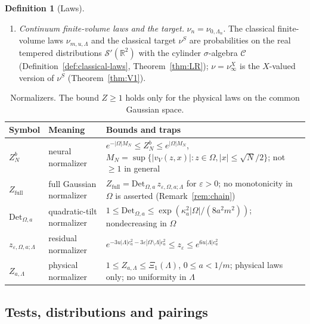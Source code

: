 \documentclass[11pt]{article}
\theoremstyle{plain}
\theoremstyle{definition}
\newtheorem{definition}[theorem]{Definition}
\theoremstyle{remark}
\newcommand{\R}{\mathbb{R}}
\newcommand{\E}{\mathbb{E}}
\newcommand{\cC}{\mathcal{C}}
\newcommand{\cS}{\mathcal{S}}
\newcommand{\ind}{\mathbf{1}}
\newcommand{\Det}{\mathrm{Det}}
\begin{document}
\begin{definition}[Laws]
\begin{enumerate}[label=(\alph*)]
  \begin{equation}\label{eq:physlaw}
  \nu_{a,\Lambda}(B)=\E_0\bigl[\ind_B(\Phi_a)\,e^{-U_{a,\Lambda}}\bigr]/Z_{a,\Lambda}.
  \end{equation}
\item \emph{Continuum finite-volume laws and the target.} $\nu_n=\nu_{0,\Lambda_n}$.
  The classical finite-volume laws $\nu_{m,u,\Lambda}$ and the classical target
  $\nu^{S}$ are probabilities on the real tempered distributions $\cS'(\R^{2})$
  with the cylinder $\sigma$-algebra $\cC$ (Definition~\ref{def:classical-laws},
  Theorem~\ref{thm:LR}); $\nu=\nu^{X}_\infty$ is the $X$-valued version of
  $\nu^{S}$ (Theorem~\ref{thm:V1}).
\end{enumerate}
\end{definition}

\begin{table}[ht]
\centering
\small
\begin{tabular}{@{}p{}p{}p{}@{}}
\toprule
Symbol & Meaning & Bounds and traps\\
\midrule
$Z^{b}_{N}$ & neural normalizer & $e^{-|\Omega|M_N}\le Z^b_N\le e^{|\Omega|M_N}$, $M_N=\sup\{|v_V(z,x)|:z\in\Omega,|x|\le\sqrt N/2\}$; not $\ge1$ in general\\
$Z_{\mathrm{full}}$ & full Gaussian normalizer & $Z_{\mathrm{full}}=\Det_{\Omega,a}\,z_{\varepsilon,\Omega,a;\Lambda}$ for $\varepsilon>0$; no monotonicity in $\Omega$ is asserted (Remark~\ref{rem:chain})\\
$\Det_{\Omega,a}$ & quadratic-tilt normalizer & $1\le\Det_{\Omega,a}\le\exp(\kappa_a^{2}|\Omega|/(8a^{2}m^{2}))$; nondecreasing in $\Omega$\\
$z_{\varepsilon,\Omega,a;\Lambda}$ & residual normalizer & $e^{-3u|\Lambda|c_a^{2}-3\varepsilon|\Omega\setminus\Lambda|c_a^{2}}\le z_\varepsilon\le e^{6u|\Lambda|c_a^{2}}$\\
$Z_{a,\Lambda}$ & physical normalizer & $1\le Z_{a,\Lambda}\le\Xi_{1}(\Lambda)$, $0\le a<1/m$; physical laws only; no uniformity in $\Lambda$\\
\bottomrule
\end{tabular}
\caption{Normalizers. The bound $Z\ge1$ holds only for the physical laws on the
common Gaussian space.}
\label{tab:normalizers}
\end{table}

\subsection{Tests, distributions and pairings}
\end{document}
